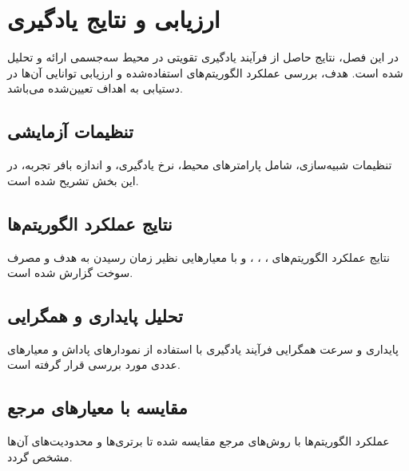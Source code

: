 \chapter{ارزیابی و نتایج یادگیری}

در این فصل، نتایج حاصل از فرآیند یادگیری تقویتی در محیط سه‌جسمی ارائه و تحلیل شده است. هدف، بررسی عملکرد الگوریتم‌های استفاده‌شده و ارزیابی توانایی آن‌ها در دستیابی به اهداف تعیین‌شده می‌باشد.

\section{تنظیمات آزمایشی}

تنظیمات شبیه‌سازی، شامل پارامترهای محیط، نرخ یادگیری، و اندازه بافر تجربه، در این بخش تشریح شده است.

\section{نتایج عملکرد الگوریتم‌ها}

نتایج عملکرد الگوریتم‌های ، ، ، و  با معیارهایی نظیر زمان رسیدن به هدف و مصرف سوخت گزارش شده است.

\section{تحلیل پایداری و همگرایی}

پایداری و سرعت همگرایی فرآیند یادگیری با استفاده از نمودارهای پاداش و معیارهای عددی مورد بررسی قرار گرفته است.

\section{مقایسه با معیارهای مرجع}

عملکرد الگوریتم‌ها با روش‌های مرجع مقایسه شده تا برتری‌ها و محدودیت‌های آن‌ها مشخص گردد.


